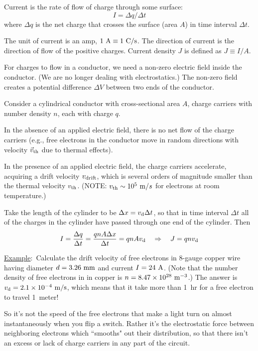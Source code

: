\documentclass[10pt,twoside]{article}
\def\be{\begin{equation}}
\def\ee{\end{equation}}
\def\i{\item{}}
\def\ex{\underline{Example}:\ }
\begin{document}
\i Current is the rate of flow of charge through
some surface:
\be
I = \Delta q/\Delta t
\ee
where $\Delta q$ is the net charge that crosses 
the surface (area $A$) in time interval $\Delta t$.

\i The unit of current is an amp, 
$1~{\rm A} \equiv 1~{\rm C}/{\rm s}$.
The direction of current is the direction
of flow of the positive charges.
Current density $J$ is defined as
$J\equiv I/A$.

\i For charges to flow in a conductor, we need a 
non-zero electric field inside the conductor.  
(We are no longer dealing with electrostatics.)
The non-zero field creates a potential difference
$\Delta V$ between two ends of the conductor.

\i Consider a cylindrical conductor with 
cross-sectional area $A$, charge carriers with 
number density $n$, each with charge $q$.

\i In the absence of an applied electric field,
there is no net flow of the charge carriers
(e.g., free electrons in the conductor move in 
random directions with velocity $\vec v_{\rm th}$
due to thermal effects).

\i In the presence of an applied electric field,
the charge carriers accelerate, acquiring a 
drift velocity $v_{\rm drift}$, which is several orders 
of magnitude smaller than the thermal velocity
$v_{\rm th}$. 
(NOTE: $v_{\rm th} \sim 10^5~{\rm m}/{s}$
for electrons at room temperature.)

\i Take the length of the cylinder to be 
$\Delta x = v_{\rm d}\Delta t$,
so that in time interval $\Delta t$ all of the charges 
in the cylinder have passed through one end of the cylinder.
Then
%
\be
I = \frac{\Delta q}{\Delta t}
= \frac{q n A \Delta x}{\Delta t}= qnA v_{\rm d}
\quad\Rightarrow\quad
J= qnv_{\rm d}
\ee
 
\i \ex Calculate the drift velocity of free electrons in 
8-gauge copper wire having diameter
$d=3.26~{\rm mm}$ and current $I=24~{\rm A}$.
(Note that the number density of free electrons in in copper
is $n=8.47\times 10^{28}~{\rm m}^{-3}$.)
The answer is $v_{\rm d}=2.1\times 10^{-4}~{\rm m}/{\rm s}$,
which means that it take more than 1~hr for a free
electron to travel 1~meter!

\i So it's not the speed of the free electrons that 
make a light turn on almost instantaneously when you 
flip a switch.
Rather it's the electrostatic force between neighboring
electrons which ``smooths" out their distribution, so
that there isn't an excess 
or lack of charge carriers in any part of the circuit.
\end{document}
